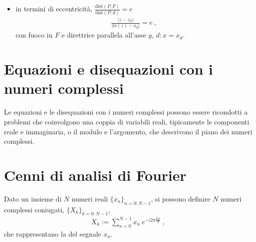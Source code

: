 \documentclass[letterpaper,10pt,italian]{jupyterBook}
\begin{document}
\begin{itemize}
\begin{itemize}
\begin{itemize}
\item {} 
\sphinxAtStartPar
iperbole:      \(||z-z_1| - |z-z_2|| = 2a\)

\end{itemize}

\item {} 
\sphinxAtStartPar
in termini di eccentricità, \(\frac{\text{dist}(P,F)}{\text{dist}(P,d)} = e\)
\begin{equation*}
\begin{split}\frac{|z - z_F|}{|\text{re}(z) - x_d|} = e \ ,\end{split}
\end{equation*}
\sphinxAtStartPar
con fuoco in \(F\) e direttrice parallela all’asse \(y\), \(d: x = x_d\).

\end{itemize}

\end{itemize}

\sphinxAtStartPar
{} 


\section{Equazioni e disequazioni con i numeri complessi}
\label{\detokenize{ch/algebra/complex-algebra:equazioni-e-disequazioni-con-i-numeri-complessi}}\label{\detokenize{ch/algebra/complex-algebra:math-hs-algebra-complex-equations}}
\sphinxAtStartPar
Le equazioni e le disequazioni con i numeri complessi possono essere ricondotti a problemi che coinvolgono una coppia di variabili reali, tipicamente le componenti reale e immaginaria, o il modulo e l’argomento, che descrivono il piano dei numeri complessi.

\sphinxAtStartPar
{}


\section{Cenni di analisi di Fourier}
\label{\detokenize{ch/algebra/complex-algebra:cenni-di-analisi-di-fourier}}\label{\detokenize{ch/algebra/complex-algebra:math-hs-algebra-complex-fourier}}
\sphinxAtStartPar
Dato un insieme di \(N\) numeri reali \(\{x_n\}_{n=0:N-1}\), si possono definire \(N\) numeri complessi coniugati, \(\{ X_k \}_{k=0:N-1}\),
\begin{equation*}
\begin{split}X_k := \sum_{n=0}^{N-1} x_n \ e^{-i 2 \pi \frac{k n}{N}} \ ,\end{split}
\end{equation*}
\sphinxAtStartPar
che rappresentano la  del segnale \(x_n\).
\end{document}
